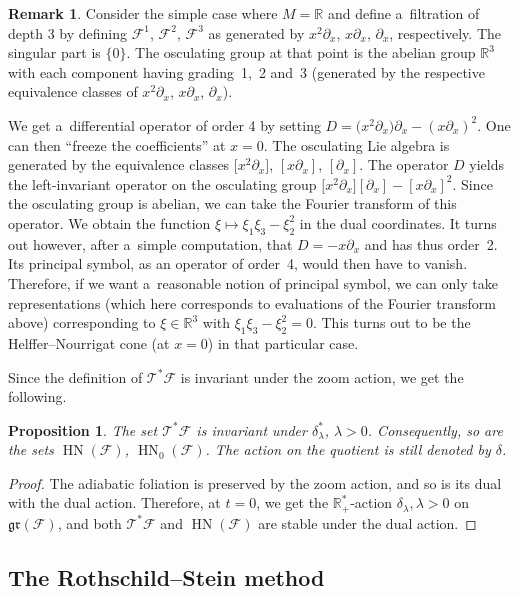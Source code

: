 \documentclass[10pt,a4paper]{article}
\newcommand{\R}{\mathbb R} %
\newcommand{\F}{\mathcal{F}} %
\newcommand{\T}{\mathcal{T}} %
\newcommand{\HN}{\operatorname{HN}} %
\newcommand{\Fb}{\mathcal{F}} %
\newcommand{\gr}{\mathfrak{gr}} %
\numberwithin{equation}{section}
\newtheorem{prop}[thm]{Proposition}
\theoremstyle{definition}
\newtheorem{rem}[thm]{Remark}
\begin{document}
\begin{rem}\label{Remark : One cannot use all the representations}
 Consider the simple case where $M = \R$ and define a~filtration of depth 3 by defining $\F^1$, $\F^2$, $\F^3$ as generated by $x^2\partial_x$, $x\partial_x$, $\partial_x$, respectively. The singular part is $\{0\}$. The osculating group at that point is the abelian group $\R^3$ with each component having grading~1,~2 and~3 (generated by the respective equivalence classes of $x^2\partial_x$, $x\partial_x$, $\partial_x$).

 We get a~differential operator of order 4 by setting $D= \bigl(x^2\partial_x\bigr)\partial_x - (x\partial_x)^2$. One can then ``freeze the coefficients'' at $x = 0$. The osculating Lie algebra is generated by the equivalence classes $\big[x^2\partial_x\big]$, $[x\partial_x]$, $[\partial_x]$. The operator $D$ yields the left-invariant operator on the osculating group $\big[x^2\partial_x\big][\partial_x] - [x\partial_x]^2$. Since the osculating group is abelian, we can take the Fourier transform of this operator. We obtain the function $\xi \mapsto \xi_1\xi_3 - \xi_2^2$ in the dual coordinates. It turns out however, after a~simple computation, that $D = -x\partial_x$ and has thus order~2. Its principal symbol, as an operator of order~4, would then have to vanish. Therefore, if we want a~reasonable notion of principal symbol, we can only take representations (which here corresponds to evaluations of the Fourier transform above) corresponding to $\xi \in \R^3$ with $\xi_1\xi_3 - \xi_2^2 = 0$. This turns out to be the Helffer--Nourrigat cone (at $x=0$) in that particular case.
\end{rem}

Since the definition of $\T^*\F$ is invariant under the zoom action, we get the following.


\begin{prop}
 The set $\T^*\F$ is invariant under $\delta^*_{\lambda}$, $\lambda>0$. Consequently, so are the sets $\HN(\Fb)$, $\HN_0(\Fb)$. The action on the quotient is still denoted by $\delta$.
\end{prop}
\begin{proof}
 The adiabatic foliation is preserved by the zoom action, and so is its dual with the dual action. Therefore, at $t=0$, we get the $\R^*_+$-action $\delta_{\lambda}, \lambda > 0$ on $\gr(\Fb)$, and both $\T^*\F$ and $\HN(\Fb)$ are stable under the dual action.
\end{proof}

\subsection{The Rothschild--Stein method}\label{Subsection:Rothschild--Stein}
\end{document}
